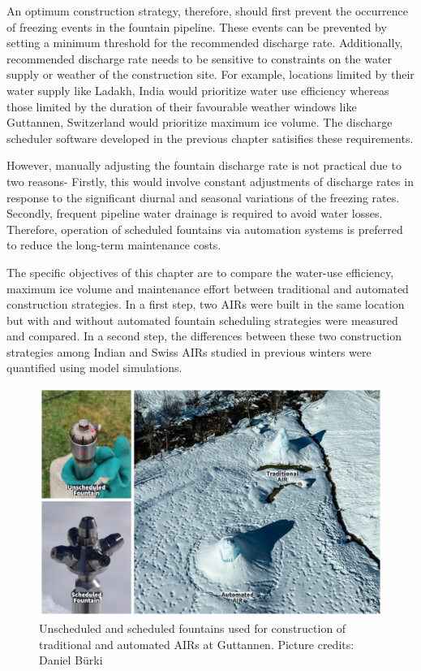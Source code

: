 An optimum construction strategy, therefore, should first prevent the occurrence of freezing events in the
fountain pipeline. These events can be prevented by setting a minimum threshold for the recommended discharge
rate. Additionally, recommended discharge rate needs to be sensitive to constraints on the water supply or
weather of the construction site. For example, locations limited by their water supply like Ladakh, India
would prioritize water use efficiency whereas those limited by the duration of their favourable weather windows
like Guttannen, Switzerland would prioritize maximum ice volume. The discharge scheduler software developed in
the previous chapter satisifies these requirements.

However, manually adjusting the fountain discharge rate is not practical due to two reasons- Firstly, this would
involve constant adjustments of discharge rates in response to the significant diurnal and seasonal variations
of the freezing rates. Secondly, frequent pipeline water drainage is required to avoid water losses. Therefore,
operation of scheduled fountains via automation systems is preferred to reduce the long-term maintenance costs.

The specific objectives of this chapter are to compare the water-use efficiency, maximum ice volume and
maintenance effort between traditional and automated construction strategies. In a first step, two AIRs were
built in the same location but with and without automated fountain scheduling strategies were measured and
compared. In a second step, the differences between these two construction strategies among Indian and Swiss
AIRs studied in previous winters were quantified using model simulations. 

\begin{figure}[htb]
\includegraphics[width=12cm]{figs/AIR_fountains.jpg}
\caption{Unscheduled and scheduled fountains used for construction of traditional and automated AIRs at Guttannen. Picture credits: Daniel Bürki}
\label{fig:2AIR}
\end{figure}

